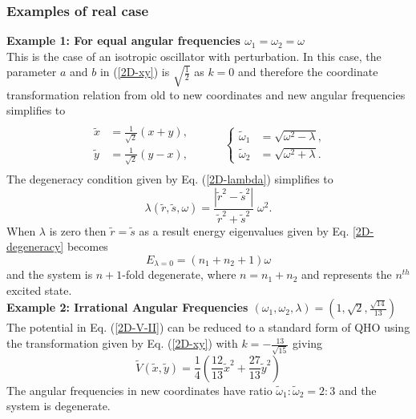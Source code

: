 \documentclass[a4paper, 12pt]{article}
\newcommand{\td}[1]{\tilde{#1}}
\begin{document}
\subsubsection{Examples of real case}

{\bf Example 1: For equal angular frequencies \(\omega_1= \omega_2 = \omega\)}\\

This is the case of an isotropic oscillator with perturbation. In this case, the parameter $a$ and $b$ in (\ref{2D-xy}) is $\sqrt{\frac{1}{2}}$ as $k=0$ and therefore the coordinate transformation relation from old to new coordinates and new angular frequencies simplifies to
\begin{align}
  \begin{split}
  \begin{aligned}
    \td{x}&=\frac{1}{\sqrt{2}}\left(x+y\right),\\
    \td{y}&=\frac{1}{\sqrt{2}}\left(y-x\right), 
  \end{aligned}
  & \qquad
  \left\{
  \begin{aligned}
    \td{\omega}_{1}&=\sqrt{\omega^2-\lambda},\\
    \td{\omega}_{2}&=\sqrt{\omega^2+\lambda}.
  \end{aligned}
  \right.
  \end{split}
\end{align}
The degeneracy condition given by Eq. (\ref{2D-lambda}) simplifies to
\begin{equation}
  \lambda(\td{r},\td{s},\omega)=\frac{|\td{r}^2-\td{s}^2|}{\td{r}^2+\td{s}^2}\;\omega^2.
\end{equation}
 When $\lambda$ is zero then $\td{r}=\td{s}$ as a result energy eigenvalues given by Eq. \ref{2D-degeneracy} becomes
\begin{equation}
  E_{\lambda=0}=\left(n_1+n_2+1\right)\omega
\end{equation}
and the system is $n+1$-fold degenerate, where $n=n_1+n_2$ and represents the $n^{th}$ excited state. \\

{\bf Example 2: Irrational Angular Frequencies \((\omega_1, \omega_2, \lambda) = \left(1, \sqrt{2}, \frac{\sqrt{14}}{13}\right)\)}\\

The potential in Eq. (\ref{2D-V-II}) can be reduced to a standard form of QHO using the transformation given by Eq. (\ref{2D-xy}) with $k=-\frac{13}{\sqrt{15}}$ giving
\[\tilde{V}(\td{x},\td{y})=\frac{1}{4} \left(\frac{12}{13} \td{x}^2+\frac{27}{13}\td{y}^2\right)\]
The angular frequencies in new coordinates have ratio $\td{\omega}_1:\td{\omega}_2=2:3$ and the system is degenerate.\\
\end{document}
